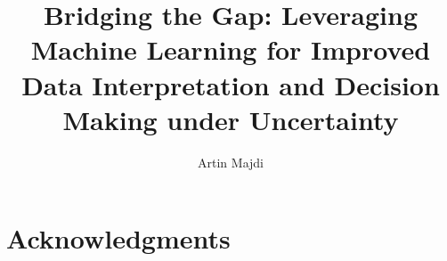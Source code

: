 \author{Artin Majdi}
\title{Bridging the Gap: Leveraging Machine Learning for Improved Data Interpretation and Decision Making under Uncertainty}



\fancyhf{}
\cfoot{\thepage}
\chead{\th}

\maketitle%

\chapter*{Acknowledgments}


%
\tableofcontents
\listoffigures
\newpage
\listoftables
\newpage

